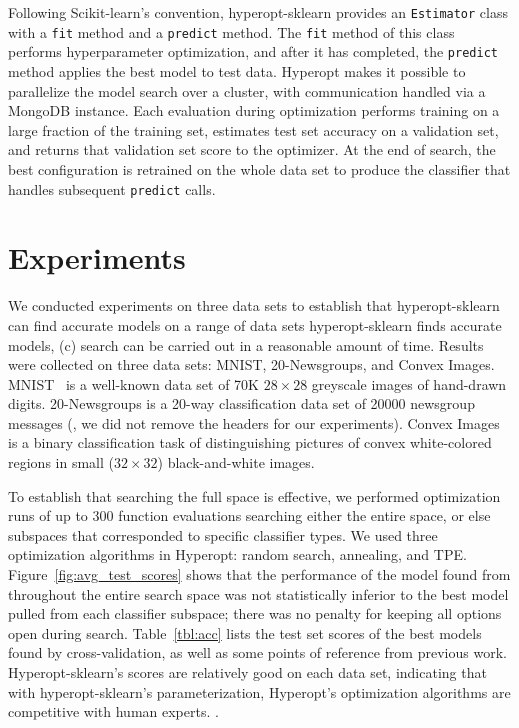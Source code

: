 \documentclass[wcp]{jmlr}
\begin{document}
Following Scikit-learn's convention, hyperopt-sklearn provides an \texttt{Estimator} class with a \texttt{fit} method and a \texttt{predict} method.
The \texttt{fit} method of this class performs hyperparameter optimization, and after it has completed, the \texttt{predict} method applies the best model to test data.
Hyperopt makes it possible to parallelize the model search over a cluster, with communication handled via a MongoDB instance.
Each evaluation during optimization performs training on a large fraction of the training set, estimates test set accuracy on a validation set, and returns that validation set score to the optimizer.
At the end of search, the best configuration is retrained on the whole data set to produce the classifier that handles subsequent \texttt{predict} calls.


\section{Experiments}
We conducted experiments on three data sets to establish that hyperopt-sklearn can find accurate models on a range of data sets
hyperopt-sklearn finds accurate models,
(c) search can be carried out in a reasonable amount of time.
Results were collected on three data sets: MNIST, 20-Newsgroups, and Convex Images.
MNIST~\citep{lecun+bottou+bengio+haffner:1998} is a well-known data set of 70K $28\times 28$ greyscale images of hand-drawn digits.
20-Newsgroups is a 20-way classification data set of 20000 newsgroup messages (\citet{20newsgroups}, we did not remove the headers for our experiments).
Convex Images~\citep{larochelle+etal:2007} is a binary classification task of distinguishing pictures of convex white-colored regions in small ($32\times 32$) black-and-white images.

To establish that searching the full space is effective,
we performed optimization runs of up to 300 function evaluations searching either the entire space, or else subspaces that corresponded to specific classifier types.
We used three optimization algorithms in Hyperopt: random search, annealing, and TPE.
Figure~\ref{fig:avg_test_scores} shows that the performance of the model found from throughout the entire search space was not statistically inferior to the best model pulled from each classifier subspace;
there was no penalty for keeping all options open during search.
Table~\ref{tbl:acc} lists the test set scores of the best models found by cross-validation, as well as some points of reference from previous work.
Hyperopt-sklearn's scores are relatively good on each data set, indicating that with hyperopt-sklearn's parameterization, Hyperopt's optimization algorithms are competitive with human experts.
\citep{eggensperger+etal:2013}
\citep{scipy}.
\end{document}
